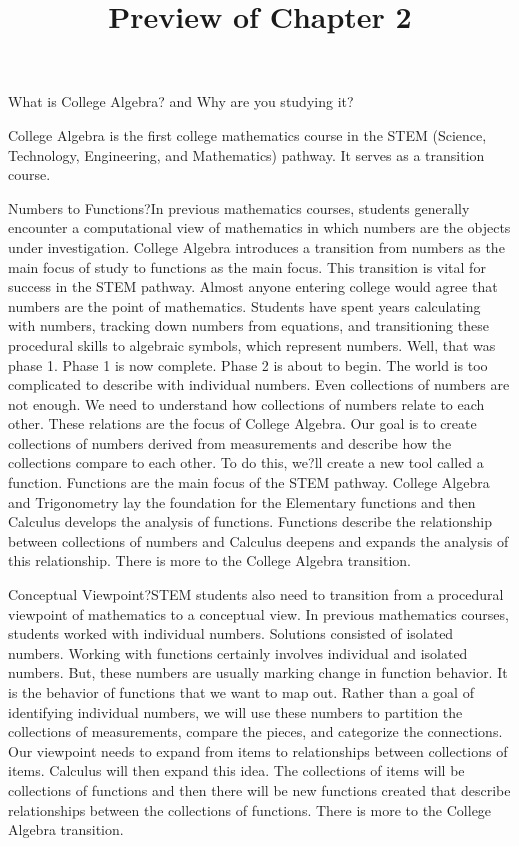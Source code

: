 \documentclass{ximera}
\title{Preview of Chapter 2}
\begin{document}
\begin{abstract}
\end{abstract}

\maketitle


What is College Algebra?
and
Why are you studying it?


College Algebra is the first college mathematics course in the STEM (Science, Technology, Engineering, and Mathematics) pathway. It serves as a transition course.

Numbers to Functions?In previous mathematics courses, students generally encounter a computational view of mathematics in which numbers are the objects under investigation. College Algebra introduces a transition from numbers as the main focus of study to functions as the main focus. This transition is vital for success in the STEM pathway.
Almost anyone entering college would agree that numbers are the point of mathematics.  Students have spent years calculating with numbers, tracking down numbers from equations, and transitioning these procedural skills to algebraic symbols, which represent numbers. Well, that was phase 1.  Phase 1 is now complete.  Phase 2 is about to begin.
The world is too complicated to describe with individual numbers. Even collections of numbers are not enough. We need to understand how collections of numbers relate to each other. These relations are the focus of College Algebra.
Our goal is to create collections of numbers derived from measurements and describe how the collections compare to each other. To do this, we?ll create a new tool called a function.
Functions are the main focus of the STEM pathway.  College Algebra and Trigonometry lay the foundation for the Elementary functions and then Calculus develops the analysis of functions.  Functions describe the relationship between collections of numbers and Calculus deepens and expands the analysis of this relationship.
There is more to the College Algebra transition.

Conceptual Viewpoint?STEM students also need to transition from a procedural viewpoint of mathematics to a conceptual view. In previous mathematics courses, students worked with individual numbers. Solutions consisted of isolated numbers. Working with functions certainly involves individual and isolated numbers. But, these numbers are usually marking change in function behavior. It is the behavior of functions that we want to map out. Rather than a goal of identifying individual numbers, we will use these numbers to partition the collections of measurements, compare the pieces, and categorize the connections. Our viewpoint needs to expand from items to relationships between collections of items.
Calculus will then expand this idea.  The collections of items will be collections of functions and then there will be new functions created that describe relationships between the collections of functions.
There is more to the College Algebra transition.
\end{document}
